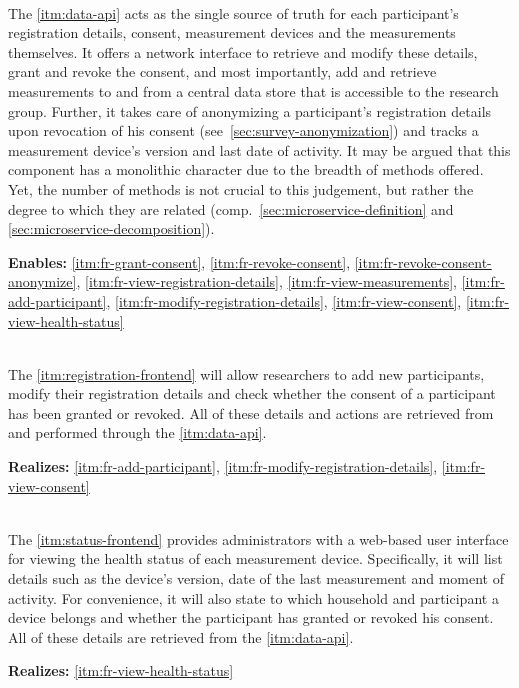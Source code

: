 \begin{description}[format={\storedescriptionlabel}]
  \item[Data \acs{API}\label{itm:data-api}]
  \hfill \\
  The \ref{itm:data-api} acts as the single source of truth for each participant's registration details, consent, measurement devices and the measurements themselves. It offers a network interface to retrieve and modify these details, grant and revoke the consent, and most importantly, add and retrieve measurements to and from a central data store that is accessible to the research group. Further, it takes care of anonymizing a participant's registration details upon revocation of his consent (see~\autoref{sec:survey-anonymization}) and tracks a measurement device's version and last date of activity. It may be argued that this component has a monolithic character due to the breadth of methods offered. Yet, the number of methods is not crucial to this judgement, but rather the degree to which they are related (comp.~\autoref{sec:microservice-definition} and \autoref{sec:microservice-decomposition}).

  \textbf{Enables:} \ref{itm:fr-grant-consent}, \ref{itm:fr-revoke-consent}, \ref{itm:fr-revoke-consent-anonymize}, \ref{itm:fr-view-registration-details}, \ref{itm:fr-view-measurements}, \ref{itm:fr-add-participant}, \ref{itm:fr-modify-registration-details}, \ref{itm:fr-view-consent}, \ref{itm:fr-view-health-status}

  \item[Registration Frontend\label{itm:registration-frontend}]
  \hfill \\
  The \ref{itm:registration-frontend} will allow researchers to add new participants, modify their registration details and check whether the consent of a participant has been granted or revoked. All of these details and actions are retrieved from and performed through the \ref{itm:data-api}.

  \textbf{Realizes:} \ref{itm:fr-add-participant}, \ref{itm:fr-modify-registration-details}, \ref{itm:fr-view-consent}

  \item[Status Frontend\label{itm:status-frontend}]
  \hfill \\
  The \ref{itm:status-frontend} provides administrators with a web-based user interface for viewing the health status of each measurement device. Specifically, it will list details such as the device's version, date of the last measurement and moment of activity. For convenience, it will also state to which household and participant a device belongs and whether the participant has granted or revoked his consent. All of these details are retrieved from the \ref{itm:data-api}.

  \textbf{Realizes:} \ref{itm:fr-view-health-status}
\end{description}



